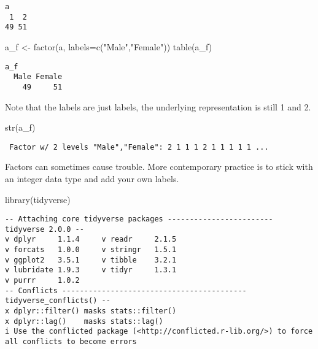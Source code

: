 \documentclass[
  letterpaper,
  DIV=11,
  numbers=noendperiod]{scrreprt}
\newenvironment{Shaded}{\begin{snugshade}}{\end{snugshade}}
\newcommand{\AttributeTok}[1]{\textcolor[rgb]{0.40,0.45,0.13}{#1}}
\newcommand{\FunctionTok}[1]{\textcolor[rgb]{0.28,0.35,0.67}{#1}}
\newcommand{\NormalTok}[1]{\textcolor[rgb]{0.00,0.23,0.31}{#1}}
\newcommand{\OtherTok}[1]{\textcolor[rgb]{0.00,0.23,0.31}{#1}}
\newcommand{\StringTok}[1]{\textcolor[rgb]{0.13,0.47,0.30}{#1}}
\begin{document}
\begin{verbatim}
a
 1  2 
49 51 
\end{verbatim}

\begin{Shaded}
\begin{Highlighting}[]
\NormalTok{a\_f }\OtherTok{\textless{}{-}} \FunctionTok{factor}\NormalTok{(a, }\AttributeTok{labels=}\FunctionTok{c}\NormalTok{(}\StringTok{"Male"}\NormalTok{,}\StringTok{"Female"}\NormalTok{))}
\FunctionTok{table}\NormalTok{(a\_f)}
\end{Highlighting}
\end{Shaded}

\begin{verbatim}
a_f
  Male Female 
    49     51 
\end{verbatim}

Note that the labels are just labels, the underlying representation is
still 1 and 2.

\begin{Shaded}
\begin{Highlighting}[]
\FunctionTok{str}\NormalTok{(a\_f)}
\end{Highlighting}
\end{Shaded}

\begin{verbatim}
 Factor w/ 2 levels "Male","Female": 2 1 1 1 2 1 1 1 1 1 ...
\end{verbatim}

Factors can sometimes cause trouble. More contemporary practice is to
stick with an integer data type and add your own labels.

\begin{Shaded}
\begin{Highlighting}[]
\FunctionTok{library}\NormalTok{(tidyverse)}
\end{Highlighting}
\end{Shaded}

\begin{verbatim}
-- Attaching core tidyverse packages ------------------------ tidyverse 2.0.0 --
v dplyr     1.1.4     v readr     2.1.5
v forcats   1.0.0     v stringr   1.5.1
v ggplot2   3.5.1     v tibble    3.2.1
v lubridate 1.9.3     v tidyr     1.3.1
v purrr     1.0.2     
-- Conflicts ------------------------------------------ tidyverse_conflicts() --
x dplyr::filter() masks stats::filter()
x dplyr::lag()    masks stats::lag()
i Use the conflicted package (<http://conflicted.r-lib.org/>) to force all conflicts to become errors
\end{verbatim}
\end{document}
